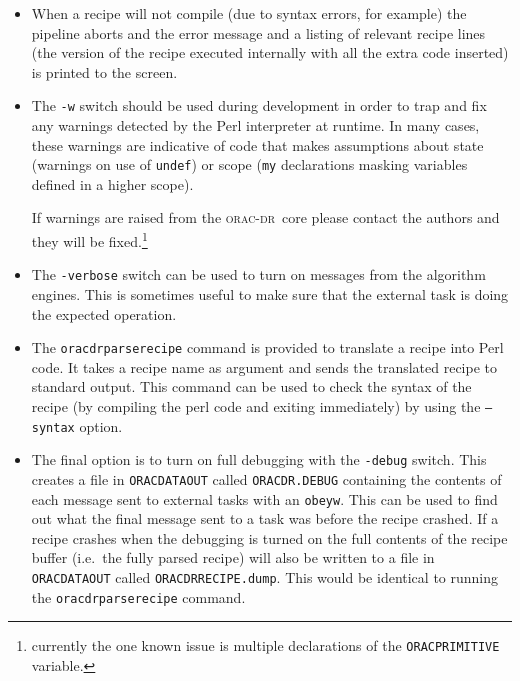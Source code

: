 \documentclass[twoside,11pt]{article}
\renewcommand{\_}{\texttt{\symbol{95}}}
\newcommand{\Oracdr}{\textsc{orac-dr}}
\begin{document}
\begin{itemize}

\item When a recipe will not compile (due to syntax errors, for
example) the pipeline aborts and the error message and a listing of
relevant recipe lines (the version of the recipe executed internally
with all the extra code inserted) is printed to the screen.

\item The \texttt{-w} switch should be used during development 
in order to trap and fix any warnings detected by the Perl interpreter
at runtime. In many cases, these warnings are indicative of code that
makes assumptions about state (warnings on use of \texttt{undef}) or
scope (\texttt{my} declarations masking variables defined in a higher
scope). 

If warnings are raised from the \Oracdr\ core please contact the
authors and they will be fixed.\footnote{currently the one known issue 
is multiple declarations of the \texttt{ORAC\_PRIMITIVE} variable.}

\item The \texttt{-verbose} switch can be used to turn on messages from 
the algorithm engines. This is sometimes useful to make sure that the
external task is doing the expected operation.

\item The \texttt{oracdr\_parse\_recipe} command is provided to translate
a recipe into Perl code. It takes a recipe name as argument and sends the
translated recipe to standard output. This command can be used to check the
syntax of the recipe (by compiling the perl code and exiting immediately)
by using the \texttt{--syntax} option.

\item The final option is to turn on full debugging with the
\texttt{-debug} switch. This creates a file in
\texttt{ORAC\_DATA\_OUT} called \texttt{ORACDR.DEBUG} containing the
contents of each message sent to external tasks with an
\texttt{obeyw}. This can be used to find out what the final message
sent to a task was before the recipe crashed. If a
recipe crashes when the debugging is turned on the full contents of
the recipe buffer (i.e.\ the fully parsed recipe) will also be written 
to a file in \texttt{ORAC\_DATA\_OUT} called
\texttt{ORACDR\_RECIPE.dump}. This would be identical to running the
\texttt{oracdr\_parse\_recipe} command.

\end{itemize}
\end{document}
